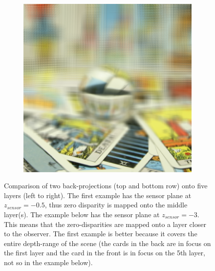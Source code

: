 \documentclass[11pt,a4paper,titlepage]{article}
\begin{document}
\begin{figure}
\begin{subfigure}[t]{0.19\textwidth}
	\end{subfigure}%
	~
	\begin{subfigure}[t]{0.19\textwidth}
		\includegraphics[width=\textwidth]{results/tarot_back_projection/sensorPlaneZ=-3/Back_Projection_layer_5.png}
	\end{subfigure}%
	
	\caption{Comparison of two back-projections (top and bottom row) onto five layers (left to right). The first example has the sensor plane at $z_{sensor} = -0.5$, thus zero disparity is mapped onto the middle layer(s). The example below has the sensor plane at $z_{sensor} = -3$. This means that the zero-disparities are mapped onto a layer closer to the observer. The first example is better because it covers the entire depth-range of the scene (the cards in the back are in focus on the first layer and the card in the front is in focus on the 5th layer, not so in the example below).}
	\label{fig:comparison_of_two_backprojections}
\end{figure}
\end{document}
